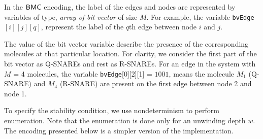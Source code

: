 In the $\mathsf{BMC}$ encoding, the label of the edges and nodes are represented by variables of type, \textit{array of bit vector} of size $M$. 
%
For example, the variable \texttt{bvEdge}$[i][j][q]$, represent the label of the $q$th edge between node $i$ and $j$.

%
%
%
%
%
% 
%
%
%
%
%
%
%
%
%
The value of the bit vector variable describe the presence of the corresponding molecules at that particular location. 
%
For clarity, we consider the first part of the bit vector as Q-SNAREs and rest as R-SNAREs.
%
For an edge in the system with $M$ = 4 molecules, the variable \texttt{bvEdge}[0][2][1] = $1001$, means the molecule  $M_{1}$ (Q-SNARE) and $M_{4}$ (R-SNARE) are present on the first edge between node 2 and node 1.

To specify the stability condition, we use nondeterminism to perform enumeration.
%
%
%
%
Note that the enumeration is done only for an unwinding depth $w$.
%
The encoding presented below is a simpler version of the implementation. 
